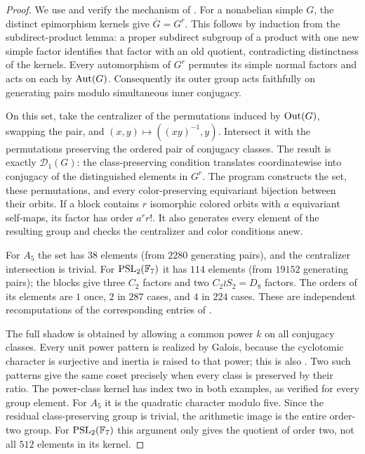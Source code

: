 \begin{proof}
We use and verify the mechanism of
\citet[Theorem 4.9 and Proposition 4.12]{Guillot2015root}.
For a nonabelian simple $G$, the distinct epimorphism kernels give
$\overline G=G^r$. This follows by induction from the subdirect-product
lemma: a proper subdirect subgroup of a product with one new simple
factor identifies that factor with an old quotient, contradicting
distinctness of the kernels. Every automorphism of $G^r$ permutes its
simple normal factors and acts on each by $\operatorname{Aut}(G)$.
Consequently its outer group acts faithfully on generating pairs modulo
simultaneous inner conjugacy.

On this set, take the centralizer of the permutations induced by
$\operatorname{Out}(G)$, swapping the pair, and $(x,y)\mapsto((xy)^{-1},y)$.
Intersect it with the permutations preserving the ordered pair of
conjugacy classes. The result is exactly $\mathcal D_1(G)$: the
class-preserving condition translates coordinatewise into conjugacy of
the distinguished elements in $G^r$. The program constructs the set,
these permutations, and every color-preserving equivariant bijection
between their orbits. If a block contains $r$ isomorphic colored orbits
with $a$ equivariant self-maps, its factor has order $a^r r!$.
It also generates every element of the resulting group and checks the
centralizer and color conditions anew.

For $A_5$ the set has $38$ elements (from $2280$ generating pairs), and
the centralizer intersection is trivial. For $\operatorname{PSL}_2(\mathbb F_7)$ it
has $114$ elements (from $19152$ generating pairs); the blocks give
three $C_2$ factors and two $C_2\wr S_2=D_8$ factors. The orders of its
elements are $1$ once, $2$ in $287$ cases, and $4$ in $224$ cases.
These are independent recomputations of the corresponding entries of
\citet[Theorem 5.2]{Guillot2015root}.

The full shadow is obtained by allowing a common power $k$ on all
conjugacy classes. Every unit power pattern is realized by Galois,
because the cyclotomic character is surjective and inertia is raised
to that power; this is also \citet[Lemma 2.3]{Guillot2015root}.
Two such patterns give the same coset precisely when every class is
preserved by their ratio. The power-class kernel has index two in both
examples, as verified for every group element. For $A_5$ it is the
quadratic character modulo five. Since the residual class-preserving
group is trivial, the arithmetic image is the entire order-two group.
For $\operatorname{PSL}_2(\mathbb F_7)$ this argument only gives the quotient of
order two, not all $512$ elements in its kernel.


\end{proof}
